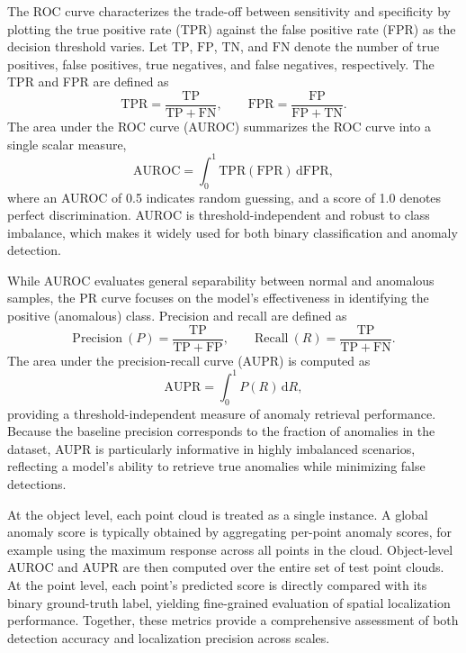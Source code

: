 The ROC curve characterizes the trade-off between sensitivity and specificity by plotting the true positive rate (TPR) against the false positive rate (FPR) as the decision threshold varies. Let $\mathrm{TP}$, $\mathrm{FP}$, $\mathrm{TN}$, and $\mathrm{FN}$ denote the number of true positives, false positives, true negatives, and false negatives, respectively. The TPR and FPR are defined as
\begin{equation}
\mathrm{TPR} = \frac{\mathrm{TP}}{\mathrm{TP} + \mathrm{FN}}, 
\qquad
\mathrm{FPR} = \frac{\mathrm{FP}}{\mathrm{FP} + \mathrm{TN}}.
\end{equation}
The area under the ROC curve (AUROC) summarizes the ROC curve into a single scalar measure,
\begin{equation}
\mathrm{AUROC} = \int_{0}^{1} \mathrm{TPR}(\mathrm{FPR})\,\mathrm{d}\mathrm{FPR},
\end{equation}
where an AUROC of 0.5 indicates random guessing, and a score of 1.0 denotes perfect discrimination. AUROC is threshold-independent and robust to class imbalance, which makes it widely used for both binary classification and anomaly detection.

While AUROC evaluates general separability between normal and anomalous samples, the PR curve focuses on the model's effectiveness in identifying the positive (anomalous) class. Precision and recall are defined as
\begin{equation}
\mathrm{Precision}\ (P) = \frac{\mathrm{TP}}{\mathrm{TP} + \mathrm{FP}}, 
\qquad
\mathrm{Recall}\ (R) = \frac{\mathrm{TP}}{\mathrm{TP} + \mathrm{FN}}.
\end{equation}
The area under the precision-recall curve (AUPR) is computed as
\begin{equation}
\mathrm{AUPR} = \int_{0}^{1} P(R)\,\mathrm{d}R,
\end{equation}
providing a threshold-independent measure of anomaly retrieval performance. Because the baseline precision corresponds to the fraction of anomalies in the dataset, AUPR is particularly informative in highly imbalanced scenarios, reflecting a model's ability to retrieve true anomalies while minimizing false detections.

At the object level, each point cloud is treated as a single instance. A global anomaly score is typically obtained by aggregating per-point anomaly scores, for example using the maximum response across all points in the cloud. Object-level AUROC and AUPR are then computed over the entire set of test point clouds. At the point level, each point's predicted score is directly compared with its binary ground-truth label, yielding fine-grained evaluation of spatial localization performance. Together, these metrics provide a comprehensive assessment of both detection accuracy and localization precision across scales.

